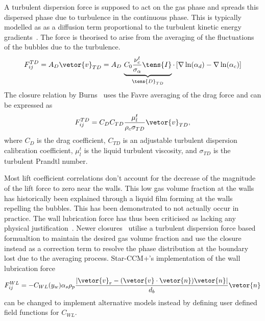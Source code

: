 A turbulent dispersion force is supposed to act on the gas phase and 
 spreads this dispersed phase due to turbulence
 in the continuous phase. This is typically modelled as 
 as a diffusion term proportional to the turbulent 
 kinetic energy gradients~\cite{liaoFlashingEvaporationDifferent2013}. 
 The force is theorised to arise from the averaging of the fluctuations
 of the bubbles due to the turbulence.
 \begin{equation}
    F_{ij}^{TD} = A_{D} \vetor{v}_{TD}
    = A_{D}\,\underbrace{C_{0} \frac{\nu_{c}^{t}}{\sigma_{\alpha}}\tens{I}}_{\tens{D}_{TD}} \cdot 
    \left[
        \nabla \ln(\alpha_{d}) - \nabla \ln(\alpha_{c})
        \right]
 \end{equation}
 The closure relation by Burns~ uses the Favre averaging of the drag
 force and can be expressed as
 \begin{equation}
    F_{ij}^{TD} = C_{D} C_{TD} \frac{\mu_{l}^{t}}{\rho_{c} \sigma_{TD}}\vetor{v}_{TD},
 \end{equation}
 where $C_{D}$ is the drag coefficient, $C_{TD}$ is an adjustable turbulent dispersion
 calibration coefficient, $\mu_{l}^{t}$ is the liquid turbulent viscosity, and
 $\sigma_{TD}$ is the turbulent Prandtl number.

Most lift
 coefficient correlations don't account for the decrease of the magnitude of the
 lift force to zero 
 near the walls. This low gas volume fraction at the walls has historically
 been explained
 through a liquid film forming at the walls repelling the bubbles. This has been demonstrated to
 not actually occur in practice. The wall lubrication force has thus been criticised
 as lacking any physical justification~\cite{sugrueRobustMomentumClosure,colomboBenchmarkingCFDModelling}.
 Newer closures~ utilise a turbulent dispersion force based 
 formualtion to maintain the desired gas volume fraction and use the closure instead
 as a correction term to resolve the phase distribution at the boundary lost due to
 the averaging process. Star-CCM+'s implementation of the wall lubrication force
 \begin{equation}
    F_{ij}^{WL} = - C_{WL}(y_{w})\alpha_{s} \rho_{p} 
    \frac{|\vetor{v}_{r} - (\vetor{v}\cdot \vetor{n})\vetor{n}|}{d_{b}} \vetor{n}
 \end{equation}
 can be changed to implement alternative models instead by defining user defined 
 field functions for $C_{WL}$.

